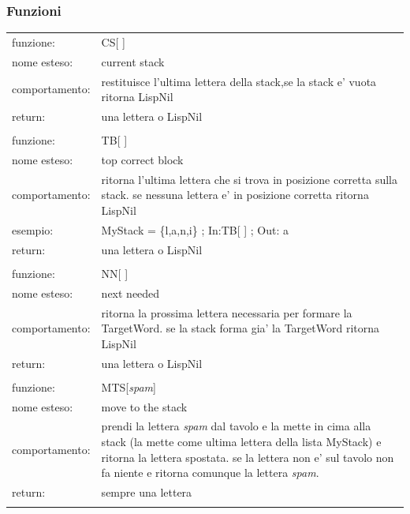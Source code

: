\documentclass[12pt, a4paper]{article}
\begin{document}
\lstset{caption=variabili di moves.m,
		label=source:movesvar}


\subsubsection{Funzioni}
\label{sec:funmoves}

\begin{longtable}{|l|p{10.0cm}|}
\hline
funzione:		& 	CS[ ]\\
nome esteso:	& 	current stack\\
comportamento:	& 	restituisce l'ultima lettera della stack,se la stack e' vuota ritorna LispNil\\
return:			& 	una lettera o LispNil\\
\hline
\multicolumn{2}{|c|}{}\\

\hline
funzione:		& 	TB[ ]	\\
nome esteso:	& 	top correct block\\
comportamento:	& 	ritorna l'ultima lettera che si trova in posizione corretta sulla stack. se nessuna lettera e' in posizione corretta ritorna LispNil\\
esempio:		&	MyStack = \{l,a,n,i\} ; In:TB[ ] ; Out: a \\
return:			& 	una lettera o LispNil\\
\hline
\multicolumn{2}{|c|}{}\\

\hline
funzione:		& 	NN[ ]\\
nome esteso:	& 	next needed\\
comportamento:	& 	ritorna la prossima lettera necessaria per formare la TargetWord. se la stack forma gia' la TargetWord ritorna LispNil\\
return:			& 	una lettera o LispNil\\
\hline
\multicolumn{2}{|c|}{}\\

\hline
funzione:		& 	MTS[{\itshape spam}]\\
nome esteso:	& 	move to the stack\\
comportamento:	& 	prendi la lettera {\itshape spam} dal tavolo e la mette in cima alla stack (la mette come ultima lettera della lista MyStack) e ritorna la lettera spostata. se la lettera non e' sul tavolo non fa niente e ritorna comunque la lettera {\itshape spam}.\\
return:			& 	sempre una lettera\\
\hline
\multicolumn{2}{|c|}{}\\


\end{longtable}
\end{document}
